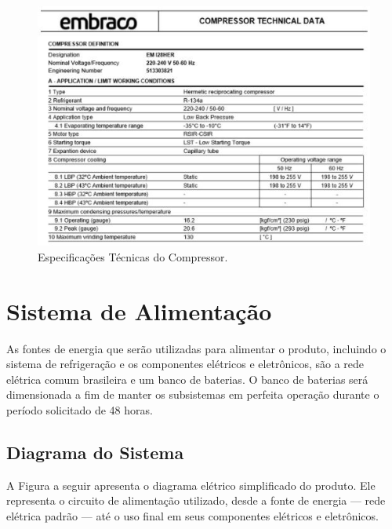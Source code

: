 	 	 	\begin{figure}[H]
	 	 		\begin{center}
	 	 			\includegraphics[scale =1]{figuras/caracteristicas}
	 	 			\caption{Especificações Técnicas do Compressor.
	 	 				 }
	 	 		\end{center}
	 	 	\end{figure}
	 	
\section{Sistema de Alimentação}
As fontes de energia que serão utilizadas para alimentar o produto, incluindo o sistema de refrigeração e os componentes elétricos e eletrônicos, são a rede elétrica comum brasileira e um banco de baterias. O banco de baterias será dimensionada a fim de manter os subsistemas em perfeita operação durante o período solicitado de 48 horas.

\subsection{Diagrama do Sistema}
A Figura a seguir apresenta o diagrama elétrico simplificado do produto. Ele representa o circuito de alimentação utilizado, desde a fonte de energia --- rede elétrica padrão --- até o uso final em seus componentes elétricos e eletrônicos.

